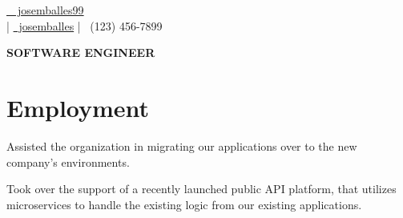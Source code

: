 \documentclass[]{deedy-resume}
\begin{document}
%
%
\lastupdated

%
%


{\href{https://github.com/josemballes99}{\faGithubSquare\ \, josemballes99} \\
\href{mailto: test@test.com}  | \href{https://www.linkedin.com/in/josemballes/}{\faLinkedinSquare \, josemballes}  | {\faMobile \, (123) 456-7899} 
}


\begin{center}
\huge\color{subheadings}\bf{SOFTWARE ENGINEER}
\end{center}

\section{Employment}

\begin{tightemize}
\item Assisted the organization in migrating our applications over to the new company's environments.
\item Took over the support of a recently launched public API platform, that utilizes microservices to handle the existing logic from our existing applications.
\end{tightemize}
\sectionsep
\end{document}
